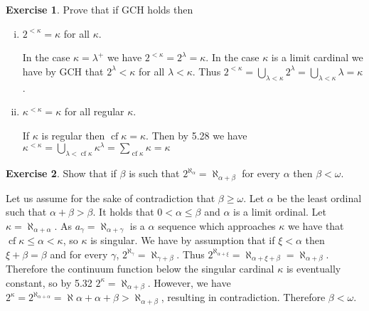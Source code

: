 \documentclass{article}
\theoremstyle{definition}
\newtheorem{exer}{Exercise}[section]
\DeclareMathOperator{\cf}{cf}
\newlength{\defparindent}
\newenvironment{answer}
    {\begin{mdframed}[backgroundcolor=gray!15, linewidth=0pt] \setlength{\parindent}{\defparindent}}
    {\end{mdframed}}
\begin{document}
\begin{exer}
    Prove that if GCH holds then 
    \begin{enumerate}[(i)]
        \item $2^{< \kappa} = \kappa$ for all $\kappa$.
        \begin{answer}
            In the case $\kappa = \lambda^+$ we have $2^{< \kappa} = 2^{\lambda} = \kappa$. In the case $\kappa$ is a limit cardinal we have by GCH that $2^\lambda < \kappa$ for all $\lambda < \kappa$. Thus $2^{< \kappa} = \bigcup_{\lambda < \kappa} 2^{\lambda} = \bigcup_{\lambda < \kappa} \lambda = \kappa$.
        \end{answer}

        \item $\kappa^{< \kappa} = \kappa$ for all regular $\kappa$.
        \begin{answer}
            If $\kappa$ is regular then $\cf \kappa = \kappa$. Then by 5.28 we have $\kappa^{< \kappa} = \bigcup_{\lambda < \cf \kappa} \kappa^{\lambda} = \sum_{\cf \kappa} \kappa = \kappa$ 
        \end{answer}
    \end{enumerate}
\end{exer}

\begin{exer}
    Show that if $\beta$ is such that $2^{\aleph_\alpha} = \aleph_{\alpha + \beta}$ for every $\alpha$ then $\beta < \omega$.
    \begin{answer}
        Let us assume for the sake of contradiction that $\beta \ge \omega$. Let $\alpha$ be the least ordinal such that $\alpha + \beta > \beta$. It holds that $0 < \alpha \le \beta$ and $\alpha$ is a limit ordinal. Let $\kappa = \aleph_{\alpha + \alpha}$. As $a_\gamma = \aleph_{\alpha + \gamma}$ is a $\alpha$ sequence which approaches $\kappa$ we have that $\cf \kappa \le \alpha < \kappa$, so $\kappa$ is singular. We have by assumption that if $\xi < \alpha$ then $\xi + \beta = \beta$ and for every $\gamma$, $2^{\aleph_\gamma} = \aleph_{\gamma + \beta}$. Thus $2^{\aleph_{\alpha + \xi}} = \aleph_{\alpha + \xi + \beta} = \aleph_{\alpha + \beta}$. Therefore the continuum function below the singular cardinal $\kappa$ is eventually constant, so by 5.32 $2^{\kappa} = \aleph_{\alpha + \beta}$. However, we have $2^{\kappa} = 2^{\aleph_{\alpha + \alpha}} = \aleph{\alpha + \alpha + \beta} > \aleph_{\alpha + \beta}$, resulting in contradiction. Therefore $\beta < \omega$.
    \end{answer}
\end{exer}
\end{document}
